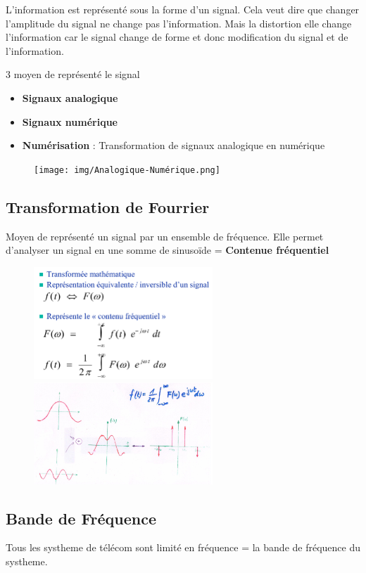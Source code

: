 	
	L'information est représenté sous la forme d'un signal. Cela veut dire que changer l'amplitude du signal ne change pas l'information. Mais la distortion elle change l'information car le signal change de forme et donc modification du signal et de l'information.
	
	3 moyen de représenté le signal
	\begin{itemize}
		\item \textbf{Signaux analogique}
		\item \textbf{Signaux numérique}
		\item \textbf{Numérisation} : Transformation de signaux analogique en numérique
	\end{itemize}
		\begin{figure}[htp]
			\centering
			\texttt{[image: img/Analogique-Numérique.png]}
		\end{figure}
		
	\subsection{Transformation de Fourrier}
		Moyen de représenté un signal par un ensemble de fréquence. Elle permet d'analyser un signal en une somme de sinusoïde = \textbf{Contenue fréquentiel}
		\begin{figure}[htp]
			\centering
			\includegraphics[width=0.6\textwidth]{img/Fourrier.png}
			\includegraphics[width=0.6\textwidth]{img/FourrierExemple.png}
		\end{figure}
		
	\subsection{Bande de Fréquence}
		Tous les systheme de télécom sont limité en fréquence = la bande de fréquence du systheme.
		
